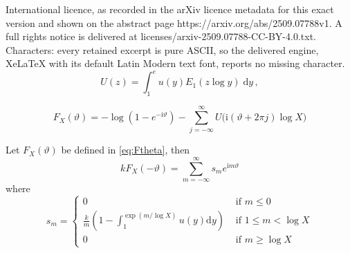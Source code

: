 \documentclass[10pt,a4paper]{amsart}
\newcommand{\dd}{\mathrm{d}}
\newcommand{\ii}{\mathrm{i}}
\begin{document}
International licence, as recorded in the arXiv licence metadata for this exact version and shown on the abstract page https://arxiv.org/abs/2509.07788v1. A full rights notice is delivered at licenses/arxiv-2509.07788-CC-BY-4.0.txt. Characters: every retained excerpt is pure ASCII, so the delivered engine, XeLaTeX with its default Latin Modern text font, reports no missing character.
\begin{equation}\label{U definition}
U(z) = \int_1^e u(y) E_1(z\log y)\;\dd y \,,
\end{equation}

\begin{equation}\label{eq:Ftheta}
F_X(\vartheta) =  - \log\left(1-e^{-\ii \vartheta} \right) -\sum_{j=-\infty}^\infty U\big(\ii(\vartheta + 2\pi j)\log X\big)
\end{equation}

\begin{lemma} \label{lem:FourierCoeffs}
    Let $F_X(\vartheta)$ be defined in \eqref{eq:Ftheta}, then
    \[
    k F_X(-\vartheta) = \sum_{m=-\infty}^\infty s_m e^{\ii m \vartheta}
    \]
    where
    \[
    s_m =
    \begin{cases}
    0 & \text{ if } m \leq 0\\
    \frac{k}{m}  \left(1 - \int_1^{\exp(m/\log X)} u(y) \dd y \right) & \text{ if } 1 \leq m < \log X  \\
    0 & \text{ if } m\geq \log X
    \end{cases}
    \]
\end{lemma}
\end{document}
